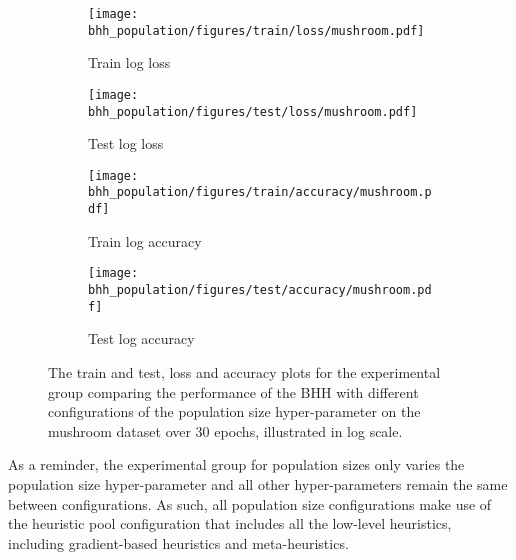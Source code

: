 \begin{figure}[htbp]
	\begin{subfigure}{0.5\textwidth}
		\centering
		\texttt{[image: bhh\_population/figures/train/loss/mushroom.pdf]}
		\caption{Train log loss}
		\label{fig:results:population:figures:loss:train:mushroom}
	\end{subfigure}
	\begin{subfigure}{0.5\textwidth}
		\centering
		\texttt{[image: bhh\_population/figures/test/loss/mushroom.pdf]}
		\caption{Test log loss}
		\label{fig:results:population:figures:loss:test:mushroom}
	\end{subfigure}
	\par\bigskip
	\begin{subfigure}{0.5\textwidth}
		\centering
		\texttt{[image: bhh\_population/figures/train/accuracy/mushroom.pdf]}
		\caption{Train log accuracy}
		\label{fig:results:population:figures:accuracy:train:mushroom}
	\end{subfigure}
	\begin{subfigure}{0.5\textwidth}
		\centering
		\texttt{[image: bhh\_population/figures/test/accuracy/mushroom.pdf]}
		\caption{Test log accuracy}
		\label{fig:results:population:figures:accuracy:test:mushroom}
	\end{subfigure}
	\par\bigskip
	\caption{The train and test, loss and accuracy plots for the experimental group comparing the performance of the \acs{BHH} with different configurations of the population size hyper-parameter on the mushroom dataset over 30 epochs, illustrated in log scale.}
	\label{fig:results:population:figures:mushroom}
\end{figure}

As a reminder, the experimental group for population sizes only varies the population size hyper-parameter and all other hyper-parameters remain the same between configurations. As such, all population size configurations make use of the heuristic pool configuration that includes all the low-level heuristics, including gradient-based heuristics and meta-heuristics.

